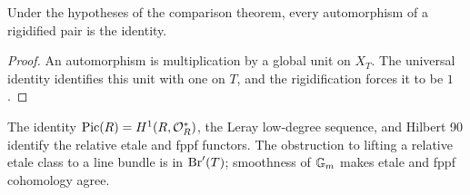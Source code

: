 \begin{lemma}\label{kps-lem-rigidified-auto}
Under the hypotheses of the comparison theorem, every automorphism of a
rigidified pair is the identity.
\end{lemma}
\begin{proof}
An automorphism is multiplication by a global unit on $X_T$. The universal
identity identifies this unit with one on $T$, and the rigidification forces it
to be $1$.
\end{proof}

\begin{remark}\label{kps-rmk-cohomology}
The identity $\operatorname{Pic}(R)=H^1(R,\mathcal O_R^*)$, the Leray low-degree sequence, and
Hilbert 90 identify the relative etale and fppf functors. The obstruction to
lifting a relative etale class to a line bundle is in $\operatorname{Br}'(T)$; smoothness of
$\mathbb G_m$ makes etale and fppf cohomology agree.
\end{remark}
